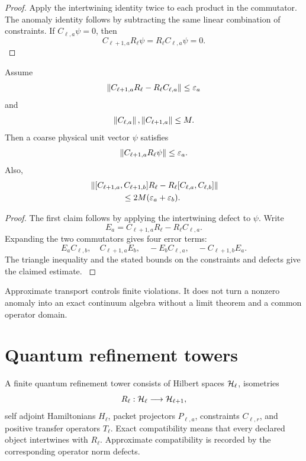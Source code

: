 \begin{proof}\label{strong:proof:071}
Apply the intertwining identity twice to each product in the commutator. The anomaly identity follows by subtracting the same linear combination of constraints. If \(C_{\ell,a}\psi=0\), then
\[
C_{\ell+1,a}R_\ell\psi=R_\ell C_{\ell,a}\psi=0.
\]
\label{strong:proof:071:end}\end{proof}

\begin{proposition}\label{strong:proposition:012}\label{strong:prop:approx_constraint_transport}
Assume
\[
\left\lVert C_{\ell+1,a}R_\ell-R_\ell C_{\ell,a}\right\rVert
\leq\varepsilon_a
\]
and
\[
\left\lVert C_{\ell,a}\right\rVert,\left\lVert C_{\ell+1,a}\right\rVert\leq M.
\]
Then a coarse physical unit vector \(\psi\) satisfies
\[
\left\lVert C_{\ell+1,a}R_\ell\psi\right\rVert\leq\varepsilon_a.
\]
Also,
\[
\begin{aligned}
&\left\lVert
[C_{\ell+1,a},C_{\ell+1,b}]R_\ell
-R_\ell[C_{\ell,a},C_{\ell,b}]
\right\rVert\\
&\hspace{4em}\leq
2M(\varepsilon_a+\varepsilon_b).
\end{aligned}
\]
\end{proposition}

\begin{proof}\label{strong:proof:072}
The first claim follows by applying the intertwining defect to \(\psi\). Write
\[
E_a=C_{\ell+1,a}R_\ell-R_\ell C_{\ell,a}.
\]
Expanding the two commutators gives four error terms:
\[
E_aC_{\ell,b},
\quad
C_{\ell+1,a}E_b,
\quad
-E_bC_{\ell,a},
\quad
-C_{\ell+1,b}E_a.
\]
The triangle inequality and the stated bounds on the constraints and defects give the claimed estimate.
\label{strong:proof:072:end}\end{proof}

Approximate transport controls finite violations. It does not turn a nonzero anomaly into an exact continuum algebra without a limit theorem and a common operator domain.

\section{Quantum refinement towers}\label{strong:section:013}\label{strong:sec:towers}

\begin{definition}\label{strong:definition:010}\label{strong:def:quantum_tower}
A finite quantum refinement tower consists of Hilbert spaces \(\Hcal_\ell\), isometries
\[
R_\ell:\Hcal_\ell\longrightarrow\Hcal_{\ell+1},
\]
self adjoint Hamiltonians \(H_\ell\), packet projectors \(P_{\ell,a}\), constraints \(C_{\ell,r}\), and positive transfer operators \(T_\ell\). Exact compatibility means that every declared object intertwines with \(R_\ell\). Approximate compatibility is recorded by the corresponding operator norm defects.
\end{definition}

